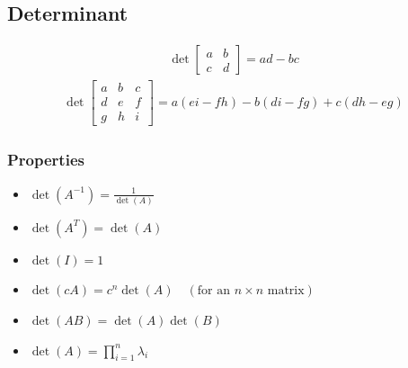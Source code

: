 \subsection{Determinant}

\begin{align*}
	\det
	\begin{bmatrix}
		a & b \\
		c & d
	\end{bmatrix}
	=
	ad-bc
\end{align*}
\begin{align*}
	\det
	\begin{bmatrix}
		a & b & c \\
		d & e & f \\
		g & h & i
	\end{bmatrix}
	=
	a(ei-fh)-b(di-fg)+c(dh-eg)
\end{align*}


\subsubsection{Properties}
\begin{itemize}
	\item $\det\left(A^{-1}\right) = \frac{1}{\det(A)}$
	\item $\det(A^T) = \det(A)$
	\item $\det(I) = 1$
	\item $\det(cA) = c^n\det(A)\quad(\text{for an }n\times n\text{ matrix})$
	\item $\det(AB) = \det(A)\det(B)$
	\item $\det(A) = \prod_{i=1}^n \lambda_i$
\end{itemize}


